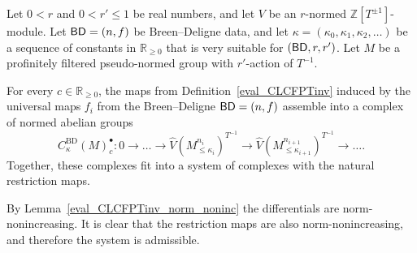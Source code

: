 \begin{definition}
  \label{BD_system}
  \leanok
  Let $0 < r$ and $0 < r' \le 1$ be real numbers,
  and let $V$ be an $r$-normed $\mathbb Z[T^{\pm 1}]$-module.
  Let $\mathsf{BD} = (n,f)$ be Breen--Deligne data,
  and let $\kappa = (\kappa_0, \kappa_1, \kappa_2, \dots)$
  be a sequence of constants in $\mathbb R_{\ge 0}$
  that is very suitable for $(\mathsf{BD}, r, r')$.
  Let $M$ be a profinitely filtered pseudo-normed group with $r'$-action of $T^{-1}$.

  For every $c \in \mathbb R_{\ge 0}$,
  the maps from Definition~\ref{eval_CLCFPTinv}
  induced by the universal maps $f_i$ from the Breen--Deligne $\mathsf{BD} = (n,f)$
  assemble into a complex of normed abelian groups
  \[
    C^{\text{BD}}_{\kappa}(M)_c^\bullet \colon
    0 \to
    \dots \to
    \hat V(M_{\le \kappa_i}^{n_i})^{T^{-1}}
    \to
    \hat V(M_{\le \kappa_{i+1}}^{n_{i+1}})^{T^{-1}}
    \to \dots.
  \]
  Together, these complexes fit into a system of complexes
  with the natural restriction maps.

  By Lemma~\ref{eval_CLCFPTinv_norm_noninc} the differentials are norm-nonincreasing.
  It is clear that the restriction maps are also norm-nonincreasing,
  and therefore the system is admissible.
\end{definition}

